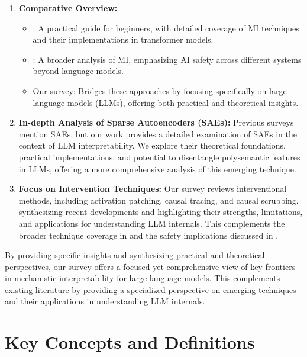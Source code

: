 \documentclass[sigconf,authoryear]{acmart}
\begin{document}
\begin{enumerate}
    \item \textbf{Comparative Overview:}
    \begin{itemize}
        \item \citet{rai2024practicalreviewmechanisticinterpretability}: A practical guide for beginners, with detailed coverage of MI techniques and their implementations in transformer models.
        \item \citet{bereska_mechanistic_2024}: A broader analysis of MI, emphasizing AI safety across different systems beyond language models.
        \item Our survey: Bridges these approaches by focusing specifically on large language models (LLMs), offering both practical and theoretical insights.
    \end{itemize}

    \item \textbf{In-depth Analysis of Sparse Autoencoders (SAEs):} Previous surveys mention SAEs, but our work provides a detailed examination of SAEs in the context of LLM interpretability. We explore their theoretical foundations, practical implementations, and potential to disentangle polysemantic features in LLMs, offering a more comprehensive analysis of this emerging technique.

    \item \textbf{Focus on Intervention Techniques:} Our survey reviews interventional methods, including activation patching, causal tracing, and causal scrubbing, synthesizing recent developments and highlighting their strengths, limitations, and applications for understanding LLM internals. This complements the broader technique coverage in \citet{rai2024practicalreviewmechanisticinterpretability} and the safety implications discussed in \citet{bereska_mechanistic_2024}.

\end{enumerate}

By providing specific insights and synthesizing practical and theoretical perspectives, our survey offers a focused yet comprehensive view of key frontiers in mechanistic interpretability for large language models. This complements existing literature by providing a specialized perspective on emerging techniques and their applications in understanding LLM internals.


\section{Key Concepts and Definitions}
\end{document}
